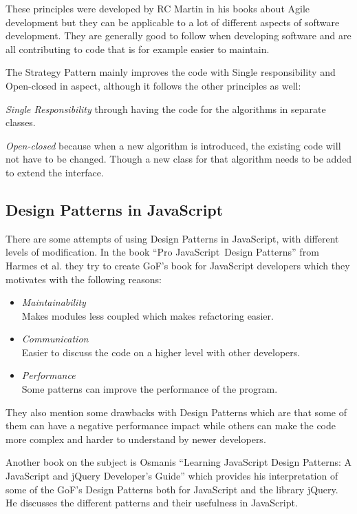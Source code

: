 \documentclass[conference, a4paper]{IEEEtran}
\begin{document}
These principles were developed by RC Martin in his books about Agile development but they can be applicable to a lot of different aspects of software development. They are generally good to follow when developing software and are all contributing to code that is for example easier to maintain.~\cite{bibitem:Bob}

The Strategy Pattern mainly improves the code with Single responsibility and Open-closed in aspect, although it follows the other principles as well:

\textit{Single Responsibility} through having the code for the algorithms in separate classes.

\textit{Open-closed} because when a new algorithm is introduced, the existing code will not have to be changed. Though a new class for that algorithm needs to be added to extend the interface.

\subsection{Design Patterns in JavaScript}
There are some attempts of using Design Patterns in JavaScript, with different levels of modification. In the book ``Pro JavaScript\texttrademark~Design Patterns'' from Harmes et al. they try to create GoF's book for JavaScript developers which they motivates with the following reasons:
\begin{itemize}
    \item \emph{Maintainability} \\
		Makes modules less coupled which makes refactoring easier.
    \item \emph{Communication} \\
		Easier to discuss the code on a higher level with other developers.
    \item \emph{Performance} \\
    Some patterns can improve the performance of the program.
\end{itemize}
They also mention some drawbacks with Design Patterns which are that some of them can have a negative performance impact while others can make the code more complex and harder to understand by newer developers.~\cite{bibitem:DiazHarmes}

Another book on the subject is Osmanis ``Learning JavaScript Design Patterns: A JavaScript and jQuery Developer's Guide'' which provides his interpretation of some of the GoF's Design Patterns both for JavaScript and the library jQuery. He discusses the different patterns and their usefulness in JavaScript.~\cite{bibitem:Osmani}
\end{document}
